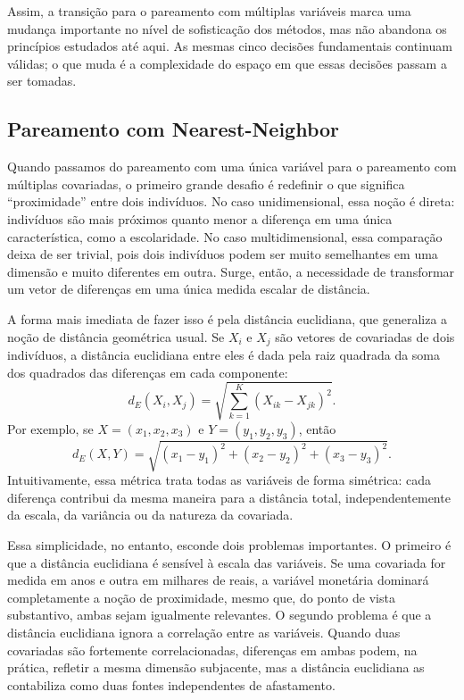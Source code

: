 Assim, a transição para o pareamento com múltiplas variáveis marca uma mudança importante no nível de sofisticação dos métodos, mas não abandona os princípios estudados até aqui. As mesmas cinco decisões fundamentais continuam válidas; o que muda é a complexidade do espaço em que essas decisões passam a ser tomadas.


\subsection{Pareamento com Nearest-Neighbor}

Quando passamos do pareamento com uma única variável para o pareamento com múltiplas covariadas, o primeiro grande desafio é redefinir o que significa “proximidade” entre dois indivíduos. No caso unidimensional, essa noção é direta: indivíduos são mais próximos quanto menor a diferença em uma única característica, como a escolaridade. No caso multidimensional, essa comparação deixa de ser trivial, pois dois indivíduos podem ser muito semelhantes em uma dimensão e muito diferentes em outra. Surge, então, a necessidade de transformar um vetor de diferenças em uma única medida escalar de distância.

A forma mais imediata de fazer isso é pela distância euclidiana, que generaliza a noção de distância geométrica usual. Se $X_i$ e $X_j$ são vetores de covariadas de dois indivíduos, a distância euclidiana entre eles é dada pela raiz quadrada da soma dos quadrados das diferenças em cada componente:
\[
d_E(X_i, X_j)
=
\sqrt{
\sum_{k=1}^K (X_{ik} - X_{jk})^2
}.
\]
Por exemplo, se $X = (x_1, x_2, x_3)$ e $Y = (y_1, y_2, y_3)$, então
\[
d_E(X, Y)
=
\sqrt{
(x_1 - y_1)^2
+
(x_2 - y_2)^2
+
(x_3 - y_3)^2
}.
\]
Intuitivamente, essa métrica trata todas as variáveis de forma simétrica: cada diferença contribui da mesma maneira para a distância total, independentemente da escala, da variância ou da natureza da covariada.



Essa simplicidade, no entanto, esconde dois problemas importantes. O primeiro é que a distância euclidiana é sensível à escala das variáveis. Se uma covariada for medida em anos e outra em milhares de reais, a variável monetária dominará completamente a noção de proximidade, mesmo que, do ponto de vista substantivo, ambas sejam igualmente relevantes. O segundo problema é que a distância euclidiana ignora a correlação entre as variáveis. Quando duas covariadas são fortemente correlacionadas, diferenças em ambas podem, na prática, refletir a mesma dimensão subjacente, mas a distância euclidiana as contabiliza como duas fontes independentes de afastamento.

